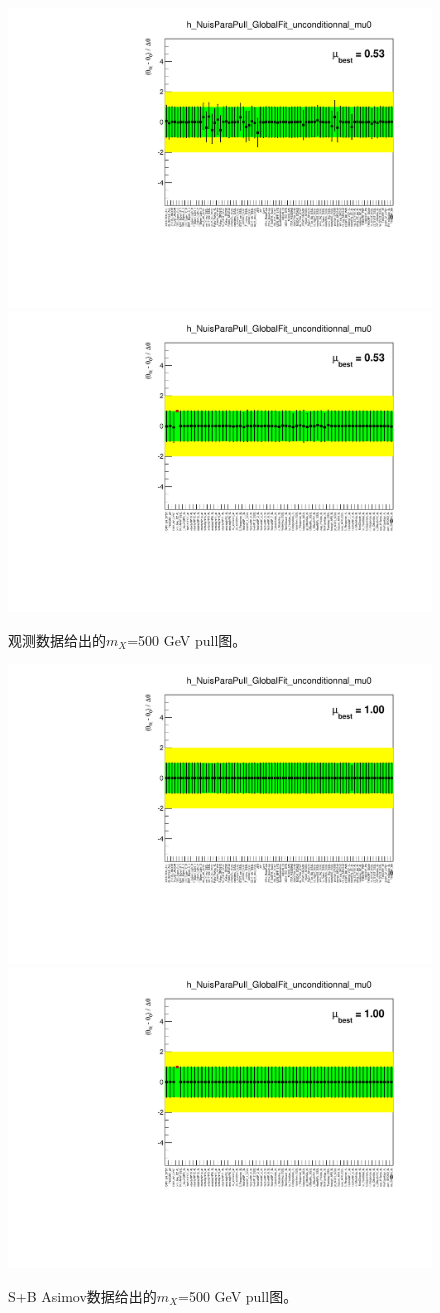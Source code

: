 \begin{figure}
\centering
\includegraphics[width=.35\textwidth, angle=-90]{fig/Statistical/combination/pull-obs-combined-mH500_1.pdf}
\includegraphics[width=.35\textwidth, angle=-90]{fig/Statistical/combination/pull-obs-combined-mH500_2.pdf}
\caption{观测数据给出的$m_X$=500 GeV pull图。}
\label{fig:pull-obs-comb-500}
\end{figure}

\begin{figure}
\centering
\includegraphics[width=.35\textwidth, angle=-90]{fig/Statistical/combination/pull-exp-combined-mH500_1_mu1.pdf}
\includegraphics[width=.35\textwidth, angle=-90]{fig/Statistical/combination/pull-exp-combined-mH500_2_mu1.pdf}
\caption{S+B Asimov数据给出的$m_X$=500 GeV pull图。}
\label{fig:pull-exp-comb-500_mu1}
\end{figure}

